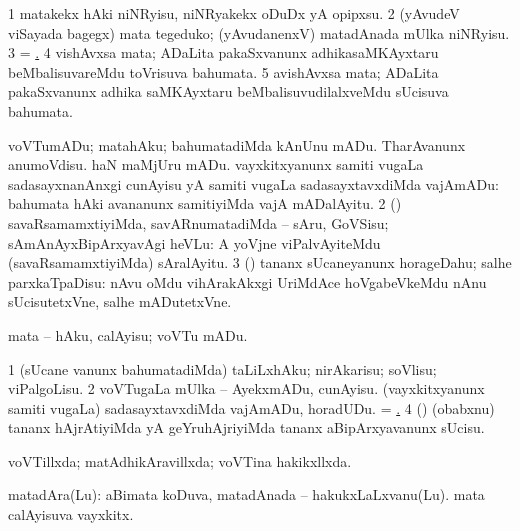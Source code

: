 {{{{{{{{{{{{{{\noindent 
\gl{\pagu}
\expl{}
\bmng
\bnum
\num{1}  matakekx hAki niNRyisu, niNRyakekx oDuDx yA opipxsu. 
\num{2}  (yAvudeV viSayada bagegx) mata tegeduko; (yAvudanenxV) matadAnada mUlka niNRyisu. 
\num{3}  = \hyperlink{vote1 pagu5}{\pagu {}.} 
\num{4}  vishAvxsa mata; ADaLita pakaSxvanunx adhikasaMKAyxtaru beMbalisuvareMdu toVrisuva bahumata. 
\hypertarget{vote1 pagu5}{} 
\num{5}  avishAvxsa mata; ADaLita pakaSxvanunx adhika saMKAyxtaru beMbalisuvudilalxveMdu sUcisuva bahumata. 
\enum
\emng
\eentry

\bentry
{} 
\gl{\sakirx}
\expl{}
\bmng
\bnum
{} voVTumADu; matahAku; bahumatadiMda 
\banum
{} kAnUnu mADu. 
 TharAvanunx anumoVdisu. 
 haN maMjUru mADu. 
 vayxkitxyanunx samiti \mo vugaLa sadasayxnanAnxgi cunAyisu yA samiti \mo vugaLa sadasayxtavxdiMda vajAmADu:  bahumata hAki avananunx samitiyiMda vajA mADalAyitu. 
\eanum
\numie
\num{2} (\AmA) savaRsamamxtiyiMda, savARnumatadiMda -- sAru, GoVSisu; sAmAnAyxBipArxyavAgi heVLu:  A yoVjne viPalvAyiteMdu (savaRsamamxtiyiMda) sAralAyitu. 
\num{3} (\AmA) tananx sUcaneyanunx horageDahu; salhe parxkaTpaDisu:  nAvu oMdu vihArakAkxgi UriMdAce hoVgabeVkeMdu nAnu sUcisutetxVne, salhe mADutetxVne. 
\enum
\emng

\noindent 
\gl{\akirx}
\expl{}
\bmng
mata -- hAku, calAyisu; voVTu mADu. 
\emng

\noindent 
\gl{\pagu}
\expl{}
\bmng
\hypertarget{vote2 pagu1}{} 
\bnum
\num{1}  (sUcane \mo vanunx bahumatadiMda) taLiLxhAku; nirAkarisu; soVlisu; viPalgoLisu. 
\num{2}  voVTugaLa mUlka -- AyekxmADu, cunAyisu. 
  
\banum
{} (vayxkitxyanunx samiti \mo vugaLa) sadasayxtavxdiMda vajAmADu, horadUDu. 
 = \hyperlink{vote2 pagu1}{\pagu {}.} 
\eanum
\numie
\num{4}  (\AmA) (obabxnu) tananx hAjrAtiyiMda yA geYruhAjriyiMda tananx aBipArxyavanunx sUcisu. 
\enum
\emng
\eentry

\bentry
{} 
\gl{\gu}
\expl{}
\bmng
 voVTillxda; matAdhikAravillxda; voVTina hakikxllxda. 
\emng
\eentry

\bentry
{} 
\gl{\nA}
\expl{}
\bmng
 matadAra(Lu): 
\banum
{} aBimata koDuva, matadAnada -- hakukxLaLxvanu(Lu). 
 mata calAyisuva vayxkitx. 
\eanum
\emng
\eentry

}}}}}}}}}}}}}}
